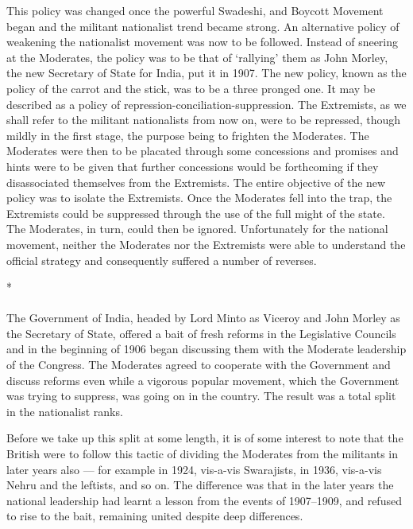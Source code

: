 This policy was changed once the powerful Swadeshi, and Boycott Movement began and the militant nationalist trend became strong. An alternative policy of weakening the nationalist movement was now to be followed. Instead of sneering at the Moderates, the policy was to be that of `rallying' them as John Morley, the new Secretary of State for India, put it in 1907. The new policy, known as the policy of the carrot and the stick, was to be a three pronged one. It may be described as a policy of repression-conciliation-suppression. The Extremists, as we shall refer to the militant nationalists from now on, were to be repressed, though mildly in the first stage, the purpose being to frighten the Moderates. The Moderates were then to be placated through some concessions and promises and hints were to be given that further concessions would be forthcoming if they disassociated themselves from the Extremists. The entire objective of the new policy was to isolate the Extremists. Once the Moderates fell into the trap, the Extremists could be suppressed through the use of the full might of the state. The Moderates, in turn, could then be ignored. Unfortunately for the national movement, neither the Moderates nor the Extremists were able to understand the official strategy and consequently suffered a number of reverses.

\begin{center}*\end{center}

\paragraph*{}

The Government of India, headed by Lord Minto as Viceroy and John Morley as the Secretary of State, offered a bait of fresh reforms in the Legislative Councils and in the beginning of 1906 began discussing them with the Moderate leadership of the Congress. The Moderates agreed to cooperate with the Government and discuss reforms even while a vigorous popular movement, which the Government was trying to suppress, was going on in the country. The result was a total split in the nationalist ranks.

Before we take up this split at some length, it is of some interest to note that the British were to follow this tactic of dividing the Moderates from the militants in later years also --- for example in 1924, vis-a-vis Swarajists, in 1936, vis-a-vis Nehru and the leftists, and so on. The difference was that in the later years the national leadership had learnt a lesson from the events of 1907--1909, and refused to rise to the bait, remaining united despite deep differences.

